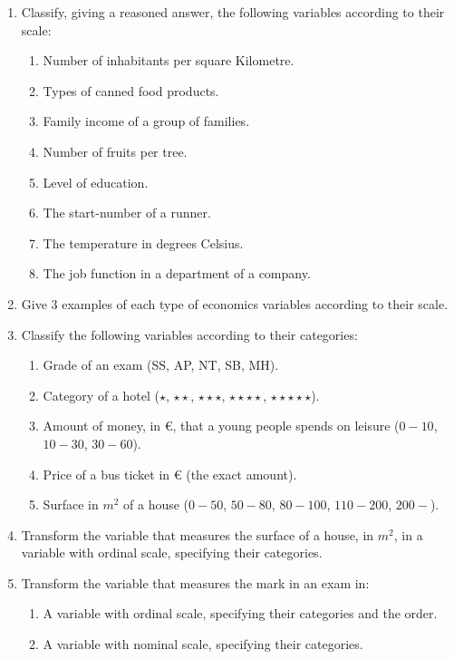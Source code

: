 \begin{enumerate}[leftmargin=*,resume]
\item Classify, giving a reasoned answer, the following variables according to their scale:
\begin{enumerate}
\item Number of inhabitants per square Kilometre. 
\item Types of canned food products.
\item Family income of a group of families. 
\item Number of fruits per tree. 
\item Level of education.
\item The start-number of a runner. 
\item The temperature in degrees Celsius. 
\item The job function in a department of a company. 
\end{enumerate}

\item Give 3 examples of each type of economics variables according to their scale. 

\item Classify the following variables according to their categories: 
\begin{enumerate}
\item Grade of an exam (SS, AP, NT, SB, MH).
\item Category of a hotel ($\star$, $\star\star$, $\star\star\star$, $\star\star\star\star$, $\star\star\star\star\star$).
\item Amount of money, in €, that a young people spends on leisure ($0-10$, $10-30$, $30-60$).
\item Price of a bus ticket in € (the exact amount).
\item Surface in $m^2$ of a house ($0-50$, $50-80$, $80-100$, $110-200$, $200-$).
\end{enumerate}

\item Transform the variable that measures the surface of a house, in $m^2$, in a variable with ordinal scale, specifying their categories. 

\item Transform the variable that measures the mark in an exam in:
\begin{enumerate}
\item A variable with ordinal scale, specifying their categories and the order.
\item A variable with nominal scale, specifying their categories.
\end{enumerate}



\end{enumerate}

